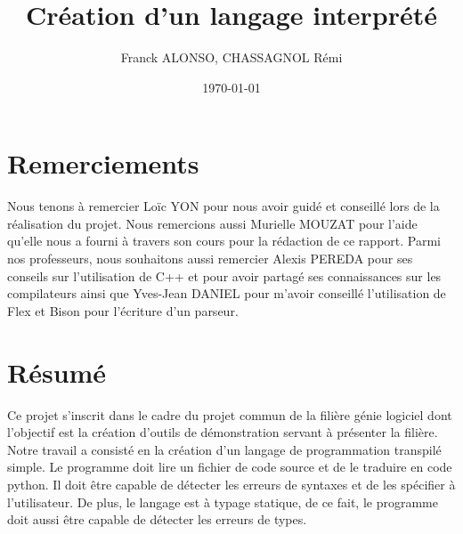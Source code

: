 \documentclass[a4paper]{article}%
\title{Création d'un langage interprété}
\author{Franck ALONSO, CHASSAGNOL Rémi}
\date{\today}
\begin{document}

\clearpage{}

\section*{Remerciements}

\doublespacing
\large %

Nous tenons à remercier Loïc YON pour nous avoir guidé et conseillé lors de la
réalisation du projet. Nous remercions aussi Murielle MOUZAT pour l'aide qu'elle
nous a fourni à travers son cours pour la rédaction de ce rapport. Parmi nos
professeurs, nous souhaitons aussi remercier Alexis PEREDA pour ses conseils sur
l'utilisation de C++ et pour avoir partagé ses connaissances sur les
compilateurs ainsi que Yves-Jean DANIEL pour m'avoir conseillé l'utilisation de
Flex et Bison pour l'écriture d'un parseur.

\normalsize
\onehalfspacing

\clearpage{}

\thispagestyle{empty}
\tableofcontents
\clearpage{}

\listoffigures
\clearpage{}


\setcounter{secnumdepth}{3}
\section*{Résumé}

Ce projet s'inscrit dans le cadre du projet commun de la filière génie logiciel
dont l'objectif est la création d'outils de démonstration servant à présenter la
filière. Notre travail a consisté en la création d'un langage de programmation
transpilé simple. Le programme doit lire un fichier de code source et de le
traduire en code python. Il doit être capable de détecter les erreurs de
syntaxes et de les spécifier à l'utilisateur. De plus, le langage est à typage
statique, de ce fait, le programme doit aussi être capable de détecter les
erreurs de types.\\
\end{document}
